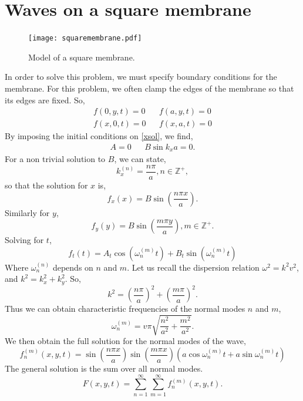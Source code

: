 \documentclass{book}
\begin{document}
\section{Waves on a square membrane}
\begin{figure}[h]
	\centering
	\texttt{[image: squaremembrane.pdf]}
	\caption{Model of a square membrane.}
	\label{squaremembrane}
\end{figure}
In order to solve this problem, we must specify boundary conditions for the membrane. For this problem, we often clamp the edges of the membrane so that its edges are fixed. So,
\begin{align}
	f(0,y,t) = 0 && f(a,y,t) = 0\\
	f(x,0,t) = 0 && f(x,a,t) = 0
\end{align}
By imposing the initial conditions on \eqref{xsol}, we find,
\begin{align}
	A = 0 && B\sin k_xa = 0.
\end{align}
For a non trivial solution to $B$, we can state,
\begin{equation}
	k_x^{(n)} = \frac{n\pi}{a}, n\in \mathbb{Z}^+,
\end{equation}
so that the solution for $x$ is,
\begin{equation}
	f_x(x) = B\sin\left(\frac{n\pi x}{a}\right).
\end{equation}
Similarly for $y$,
\begin{equation}
	f_y(y) = B\sin\left(\frac{m\pi y}{a}\right), m \in \mathbb{Z}^+.
\end{equation}
Solving for $t$,
\begin{equation}
	f_t(t) = A_t\cos(\omega_{n}^{(m)} t) + B_t \sin(\omega_{n}^{(m)} t)
\end{equation}
Where $\omega_n^{(n)}$ depends on $n$ and $m$. Let us recall the dispersion relation $\omega^2 = k^2v^2$, and $k^2 = k_x^2 + k_y^2$. So,
\begin{equation}
	k^2 = \left(\frac{n\pi}{a}\right)^2 + \left(\frac{m\pi}{a}\right)^2.
\end{equation}
Thus we can obtain characteristic frequencies of the normal modes $n$ and $m$,
\begin{equation}
	\omega_n^{(m)} = v\pi\sqrt{\frac{n^2}{a^2} + \frac{m^2}{a^2}}.
\end{equation}
We then obtain the full solution for the normal modes of the wave,
\begin{equation}
	f_n^{(m)}(x,y,t) = \sin\left(\frac{n\pi x}{a}\right)\sin\left(\frac{m\pi x}{a}\right)\left(a\cos\omega_n^{(m)}t + a\sin\omega_n^{(m)}t\right)
\end{equation}
The general solution is the sum over all normal modes.
\begin{equation}
	F(x,y,t) = \sum_{n=1}^{\infty}\sum_{m=1}^{\infty}f_n^{(m)}(x,y,t).
\end{equation}
\end{document}
